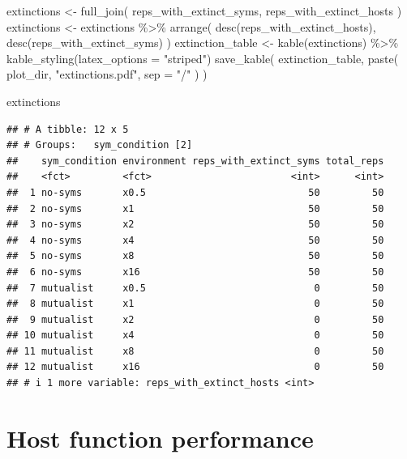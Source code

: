 \documentclass[
]{book}
\newenvironment{Shaded}{\begin{snugshade}}{\end{snugshade}}
\newcommand{\AttributeTok}[1]{\textcolor[rgb]{0.77,0.63,0.00}{#1}}
\newcommand{\FunctionTok}[1]{\textcolor[rgb]{0.00,0.00,0.00}{#1}}
\newcommand{\NormalTok}[1]{#1}
\newcommand{\OtherTok}[1]{\textcolor[rgb]{0.56,0.35,0.01}{#1}}
\newcommand{\SpecialCharTok}[1]{\textcolor[rgb]{0.00,0.00,0.00}{#1}}
\newcommand{\StringTok}[1]{\textcolor[rgb]{0.31,0.60,0.02}{#1}}
\begin{document}
\begin{Shaded}
\begin{Highlighting}[]
\NormalTok{extinctions }\OtherTok{\textless{}{-}} \FunctionTok{full\_join}\NormalTok{(}
\NormalTok{  reps\_with\_extinct\_syms,}
\NormalTok{  reps\_with\_extinct\_hosts}
\NormalTok{)}
\NormalTok{extinctions }\OtherTok{\textless{}{-}}\NormalTok{ extinctions }\SpecialCharTok{\%\textgreater{}\%}
  \FunctionTok{arrange}\NormalTok{(}
    \FunctionTok{desc}\NormalTok{(reps\_with\_extinct\_hosts), }\FunctionTok{desc}\NormalTok{(reps\_with\_extinct\_syms)}
\NormalTok{  )}
\NormalTok{extinction\_table }\OtherTok{\textless{}{-}} \FunctionTok{kable}\NormalTok{(extinctions) }\SpecialCharTok{\%\textgreater{}\%}
  \FunctionTok{kable\_styling}\NormalTok{(}\AttributeTok{latex\_options =} \StringTok{"striped"}\NormalTok{)}
\FunctionTok{save\_kable}\NormalTok{(}
\NormalTok{  extinction\_table,}
  \FunctionTok{paste}\NormalTok{(}
\NormalTok{    plot\_dir,}
    \StringTok{"extinctions.pdf"}\NormalTok{,}
    \AttributeTok{sep =} \StringTok{"/"}
\NormalTok{  )}
\NormalTok{)}

\NormalTok{extinctions}
\end{Highlighting}
\end{Shaded}

\begin{verbatim}
## # A tibble: 12 x 5
## # Groups:   sym_condition [2]
##    sym_condition environment reps_with_extinct_syms total_reps
##    <fct>         <fct>                        <int>      <int>
##  1 no-syms       x0.5                            50         50
##  2 no-syms       x1                              50         50
##  3 no-syms       x2                              50         50
##  4 no-syms       x4                              50         50
##  5 no-syms       x8                              50         50
##  6 no-syms       x16                             50         50
##  7 mutualist     x0.5                             0         50
##  8 mutualist     x1                               0         50
##  9 mutualist     x2                               0         50
## 10 mutualist     x4                               0         50
## 11 mutualist     x8                               0         50
## 12 mutualist     x16                              0         50
## # i 1 more variable: reps_with_extinct_hosts <int>
\end{verbatim}

\hypertarget{host-function-performance-2}{%
\section{Host function performance}\label{host-function-performance-2}}
\end{document}
